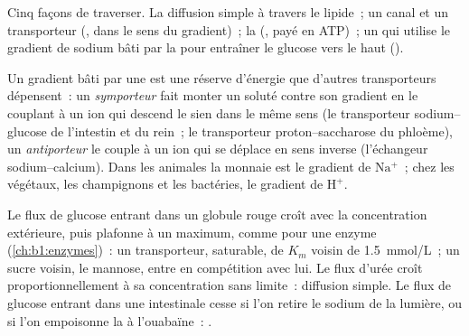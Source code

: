 \begin{omfigure}
{\small Cinq façons de traverser. La diffusion simple à travers le
lipide~; un canal et un transporteur (, dans le sens
du gradient)~; la  (,
payé en ATP)~; un  qui utilise le gradient de sodium bâti par
la  pour entraîner le glucose vers le haut ().}
\end{omfigure}

\begin{proposition}\label{prop:b1:membranes-transport:secondary}
Un gradient bâti par une  est une réserve d'énergie que d'autres
transporteurs dépensent~: un \emph{symporteur} fait
monter un soluté contre son gradient en le couplant à un ion qui
descend le sien dans le même sens (le transporteur sodium--glucose de
l'intestin et du rein~; le transporteur proton--saccharose du phloème),
un \emph{antiporteur} le couple à un ion qui se
déplace en sens inverse (l'échangeur sodium--calcium). Dans les 
animales la monnaie est le gradient de $\mathrm{Na^+}$~; chez les
végétaux, les champignons et les bactéries, le gradient de
$\mathrm{H^+}$.
\end{proposition}

\begin{example}\label{ex:b1:membranes-transport:kinetics}
Le flux de glucose entrant dans un globule rouge croît avec la
concentration extérieure, puis plafonne à un maximum, comme pour une
enzyme (\cref{ch:b1:enzymes})~: un transporteur, saturable, de $K_m$
voisin de \qty{1.5}{mmol/L}~; un sucre voisin, le mannose, entre en
compétition avec lui. Le flux d'urée croît proportionnellement à sa
concentration sans limite~: diffusion simple. Le flux de glucose entrant
dans une  intestinale cesse si l'on retire le sodium de la
lumière, ou si l'on empoisonne la  à l'ouabaïne~: .
\end{example}

